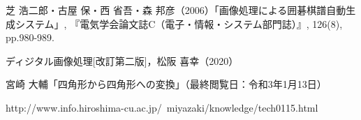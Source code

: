 \documentclass[openright]{nitocs}
\numberwithin{equation}{section}
\begin{document}
\begin{thebibliography}{10}
        芝 浩二郎・古屋 保・西 省吾・森 邦彦（2006）「画像処理による囲碁棋譜自動生成システム」,  『電気学会論文誌C（電子・情報・システム部門誌）』, 126(8), pp.980-989.

        ディジタル画像処理[改訂第二版]，松阪 喜幸（2020）

        宮崎 大輔「四角形から四角形への変換」（最終閲覧日：令和3年1月13日）

        http://www.info.hiroshima-cu.ac.jp/~miyazaki/knowledge/tech0115.html

    \end{thebibliography}
\end{document}
